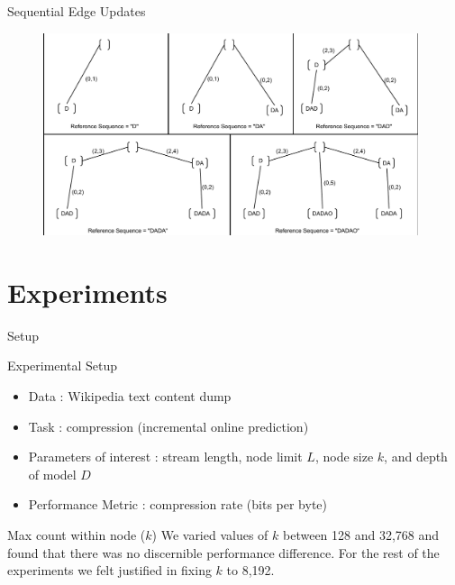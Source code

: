 \documentclass{beamer}
\begin{document}
\begin{frame}{Sequential Edge Updates}

   	\begin{figure}[t]
		\begin{center}
			\includegraphics[width = 11cm]{../figs/DADAO.pdf}
		\end{center}
	\end{figure}

\end{frame}


\section{Experiments}

\begin{frame}[t]{Setup}
	\begin{block}{Experimental Setup}
		\begin{itemize}
			\item Data : Wikipedia text content dump
			\item Task : compression (incremental online prediction)
			\item Parameters of interest : stream length, node limit $L$, node size $k$, and depth of model $D$
			\item Performance Metric : compression rate (bits per byte)
		\end{itemize}
	\end{block}
	
	\begin{block}{Max count within node ($k$)}
		We varied values of $k$ between 128 and 32,768 and found that there was no discernible performance difference.  For the rest of the experiments we felt justified in fixing $k$ to 	8,192.
	\end{block}
\end{frame}
\end{document}
